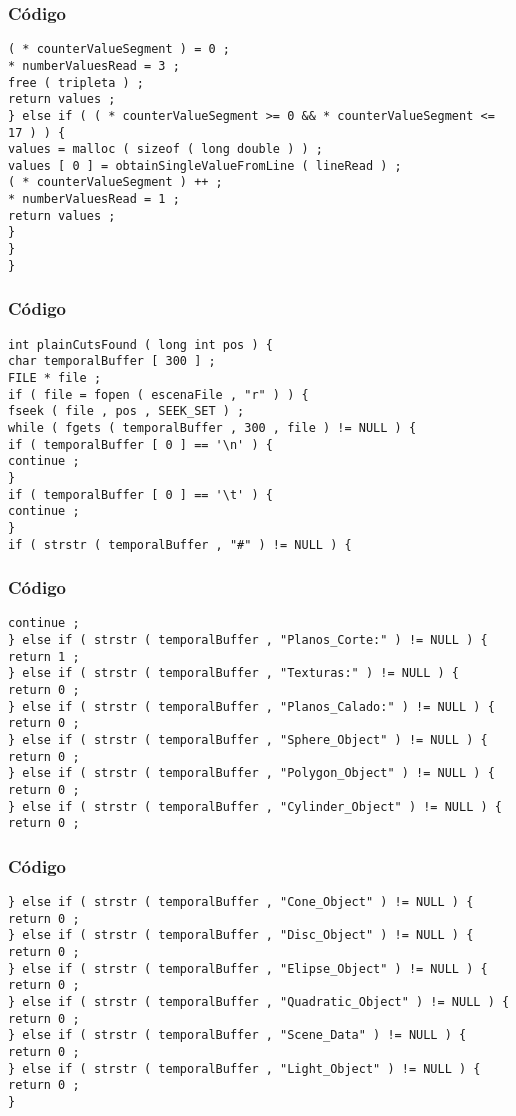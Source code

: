 \documentclass{beamer}
\begin{document}
\begin{frame}[fragile]
\frametitle{C\'odigo}
\begin{verbatim}
( * counterValueSegment ) = 0 ; 
* numberValuesRead = 3 ; 
free ( tripleta ) ; 
return values ; 
} else if ( ( * counterValueSegment >= 0 && * counterValueSegment <= 17 ) ) { 
values = malloc ( sizeof ( long double ) ) ; 
values [ 0 ] = obtainSingleValueFromLine ( lineRead ) ; 
( * counterValueSegment ) ++ ; 
* numberValuesRead = 1 ; 
return values ; 
} 
} 
} 
\end{verbatim}
\end{frame}
\begin{frame}[fragile]
\frametitle{C\'odigo}
\begin{verbatim}
int plainCutsFound ( long int pos ) { 
char temporalBuffer [ 300 ] ; 
FILE * file ; 
if ( file = fopen ( escenaFile , "r" ) ) { 
fseek ( file , pos , SEEK_SET ) ; 
while ( fgets ( temporalBuffer , 300 , file ) != NULL ) { 
if ( temporalBuffer [ 0 ] == '\n' ) { 
continue ; 
} 
if ( temporalBuffer [ 0 ] == '\t' ) { 
continue ; 
} 
if ( strstr ( temporalBuffer , "#" ) != NULL ) { 
\end{verbatim}
\end{frame}
\begin{frame}[fragile]
\frametitle{C\'odigo}
\begin{verbatim}
continue ; 
} else if ( strstr ( temporalBuffer , "Planos_Corte:" ) != NULL ) { 
return 1 ; 
} else if ( strstr ( temporalBuffer , "Texturas:" ) != NULL ) { 
return 0 ; 
} else if ( strstr ( temporalBuffer , "Planos_Calado:" ) != NULL ) { 
return 0 ; 
} else if ( strstr ( temporalBuffer , "Sphere_Object" ) != NULL ) { 
return 0 ; 
} else if ( strstr ( temporalBuffer , "Polygon_Object" ) != NULL ) { 
return 0 ; 
} else if ( strstr ( temporalBuffer , "Cylinder_Object" ) != NULL ) { 
return 0 ; 
\end{verbatim}
\end{frame}
\begin{frame}[fragile]
\frametitle{C\'odigo}
\begin{verbatim}
} else if ( strstr ( temporalBuffer , "Cone_Object" ) != NULL ) { 
return 0 ; 
} else if ( strstr ( temporalBuffer , "Disc_Object" ) != NULL ) { 
return 0 ; 
} else if ( strstr ( temporalBuffer , "Elipse_Object" ) != NULL ) { 
return 0 ; 
} else if ( strstr ( temporalBuffer , "Quadratic_Object" ) != NULL ) { 
return 0 ; 
} else if ( strstr ( temporalBuffer , "Scene_Data" ) != NULL ) { 
return 0 ; 
} else if ( strstr ( temporalBuffer , "Light_Object" ) != NULL ) { 
return 0 ; 
} 
\end{verbatim}
\end{frame}
\end{document}
